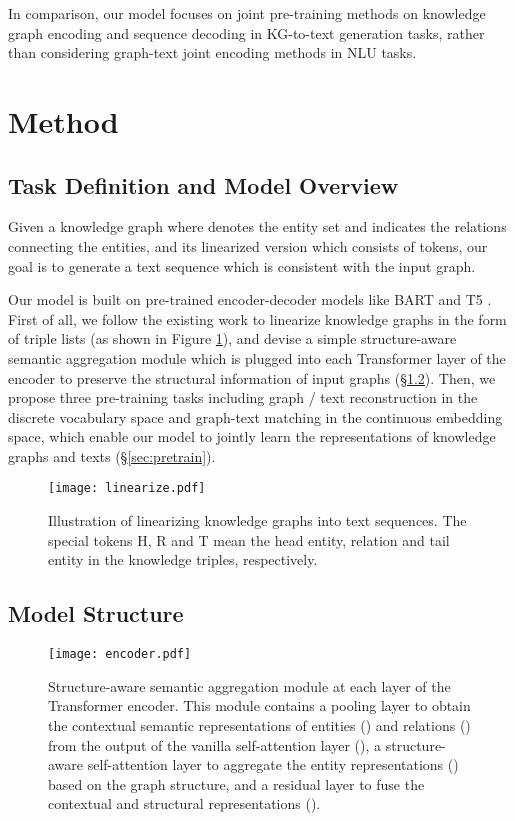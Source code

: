 \documentclass[11pt,a4paper]{article}
\begin{document}
In comparison, our model focuses on joint pre-training methods on knowledge graph encoding and sequence decoding in KG-to-text generation tasks, rather than considering graph-text joint encoding methods in NLU tasks.


\section{Method}

\subsection{Task Definition and Model Overview}

Given a knowledge graph  where  denotes the entity set and  indicates the relations connecting the entities, and its linearized version  which consists of  tokens, our goal is to generate a text sequence  which is consistent with the input graph.

Our model is built on pre-trained encoder-decoder models like BART \cite{lewis2020bart} and T5 \cite{raffel2020t5}.
First of all, we follow the existing work \cite{chen2020kgpt} to linearize knowledge graphs in the form of triple lists (as shown in Figure \ref{fig:linearize}), and devise a simple structure-aware semantic aggregation module which is plugged into each Transformer layer of the encoder to preserve the structural information of input graphs (\S \ref{sec:encoder}). Then, we propose three pre-training tasks including graph / text reconstruction in the discrete vocabulary space and graph-text matching in the continuous embedding space,
which enable our model to jointly learn the representations of knowledge graphs and texts (\S \ref{sec:pretrain}).


\begin{figure}[!htp]
  \centering
  \texttt{[image: linearize.pdf]}\caption{Illustration of linearizing knowledge graphs into text sequences. The special tokens H, R and T mean the head entity, relation and tail entity in the knowledge triples, respectively.}
  \label{fig:linearize}
\end{figure}


\subsection{Model Structure}
\label{sec:encoder}

\begin{figure}[!htp]
  \centering
  \texttt{[image: encoder.pdf]}\caption{Structure-aware semantic aggregation module at each layer of the Transformer encoder. This module contains a pooling layer to obtain the contextual semantic representations of entities () and relations () from the output of the vanilla self-attention layer (), a structure-aware self-attention layer to aggregate the entity representations () based on the graph structure, and a residual layer to fuse the contextual and structural representations ().}
  \label{fig:encoder}
\end{figure}
\end{document}
